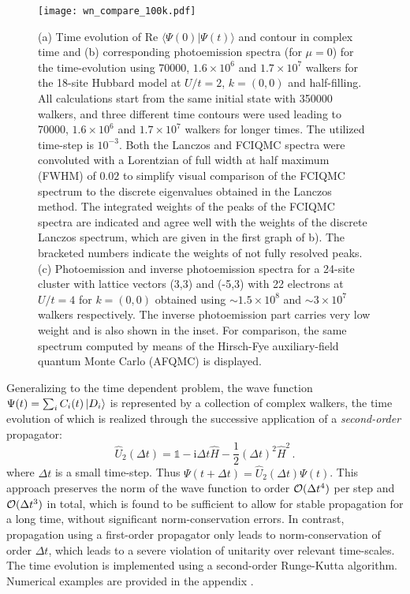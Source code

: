\documentclass[aps,prl,twocolumn,showpacs,superscriptaddress,floatfix]{revtex4-1}
\begin{document}
\begin{SCfigure*}
\centering
\caption{(a) Time evolution of Re $\langle \Psi(0)|\Psi(t)\rangle $ and
  contour in complex time and (b) 
corresponding photoemission spectra (for $\mu=0$) for 
 the time-evolution using 70000, $1.6\times 10^6$  and $1.7\times10^7$  walkers for the 18-site Hubbard model at
  $U/t=2$, $k=(0,0)$ and half-filling. All calculations start from the same initial state with 350000
walkers, and three different time contours were used leading to 70000,
$1.6\times 10^6$  and $1.7\times10^7$ walkers for
longer times. The utilized time-step is $10^{-3}$. Both the Lanczos and FCIQMC spectra were convoluted with a Lorentzian of
full width at half maximum (FWHM) of $0.02$ to simplify visual comparison of  the FCIQMC spectrum to the discrete
eigenvalues obtained in the Lanczos method. The integrated weights of the
peaks of the FCIQMC spectra are indicated and agree well with the weights of
the discrete Lanczos spectrum, which are given in the first graph of b). The
bracketed numbers indicate the weights of not fully resolved peaks.
(c) Photoemission and inverse photoemission spectra for a 24-site
cluster with lattice vectors (3,3) and (-5,3) with 22 electrons at $U/t=4$ for
$k=(0,0)$ obtained using $\sim 1.5\times 10^8$ and $\sim 3\times 10^7$ walkers respectively. The inverse photoemission part carries very low weight and is also
shown in the inset. For comparison, the same spectrum
computed by means of the Hirsch-Fye\cite{HF} auxiliary-field quantum Monte Carlo (AFQMC) is
displayed.
}
\texttt{[image: wn\_compare\_100k.pdf]}
\label{fig:panelHubWn}
\end{SCfigure*}

Generalizing to the time dependent problem, the wave function $\Psi(t)=\sum_i C_i(t) \ket{D_i}$ is represented by a collection 
of complex walkers, the time evolution of which is realized through the  
successive application of a {\em second-order} propagator: 
\begin{equation}
\hat{U}_2(\Delta t) = \mathds{1} - \mathrm{i}\Delta t\hat{H} -
\frac{1}{2}\left(\Delta t\right)^2 \hat{H}^2  \,.
\end{equation}
where $\Delta t$ is a small time-step. Thus $\Psi(t+\Delta t) = \hat{U}_2(\Delta t) \Psi(t)$. 
This approach preserves the norm of the wave function to 
order ${\cal O}(\Delta t^4)$ per step and ${\cal O}(\Delta t^3)$ in total,
which is found to be sufficient to allow for stable propagation for a long
time, without significant norm-conservation errors. In contrast, propagation 
using  a first-order propagator only leads to norm-conservation of order 
$\Delta t$, which leads to a severe violation of unitarity over relevant 
time-scales. The time evolution is implemented using a second-order Runge-Kutta
algorithm. Numerical examples are provided in the appendix
\cite{supplement}. 
\end{document}
